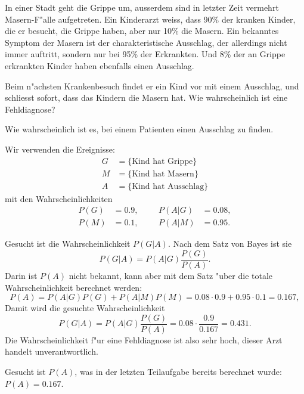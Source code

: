 In einer Stadt geht die Grippe um, ausserdem sind in letzter Zeit
vermehrt Masern-F"alle aufgetreten.
Ein Kinderarzt weiss, dass 90\% der kranken Kinder, die er besucht,
die Grippe haben, aber nur 10\% die Masern.
Ein bekanntes Symptom der Masern ist der charakteristische Ausschlag,
der allerdings nicht immer auftritt, sondern nur bei 95\% der Erkrankten.
Und 8\% der an Grippe erkrankten Kinder haben ebenfalls einen Ausschlag.
\begin{teilaufgaben}
\item
Beim n"achsten Krankenbesuch findet er ein Kind vor mit einem Ausschlag,
und schliesst sofort, dass das Kindern die Masern hat.
Wie wahrscheinlich ist eine Fehldiagnose?
\item
Wie wahrscheinlich ist es, bei einem Patienten einen Ausschlag zu finden.
\end{teilaufgaben}

\begin{loesung}
Wir verwenden die Ereignisse:
\begin{align*}
G&=\{\text{Kind hat Grippe}\}\\
M&=\{\text{Kind hat Masern}\}\\
A&=\{\text{Kind hat Ausschlag}\}
\end{align*}
mit den Wahrscheinlichkeiten
\[
\begin{aligned}
P(G)&=0.9,&&&P(A|G)&=0.08,\\
P(M)&=0.1,&&&P(A|M)&=0.95.
\end{aligned}
\]
\begin{teilaufgaben}
\item
Gesucht ist die Wahrscheinlichkeit $P(G|A)$.
Nach dem Satz von Bayes ist sie
\[
P(G|A)=P(A|G)\frac{P(G)}{P(A)}.
\]
Darin ist $P(A)$ nicht bekannt, kann aber mit dem Satz "uber die totale
Wahrscheinlichkeit berechnet werden:
\[
P(A)=P(A|G)P(G)+P(A|M)P(M)=0.08\cdot 0.9 + 0.95\cdot 0.1=0.167,
\]
Damit wird die gesuchte Wahrscheinlichkeit
\[
P(G|A)=P(A|G)\frac{P(G)}{P(A)}=0.08\cdot\frac{0.9}{0.167}=0.431.
\]
Die Wahrscheinlichkeit f"ur eine Fehldiagnose ist also sehr hoch,
dieser Arzt handelt unverantwortlich.
\item Gesucht ist $P(A)$, was in der letzten Teilaufgabe bereits
berechnet wurde: $P(A)=0.167$.
\end{teilaufgaben}
\end{loesung}

